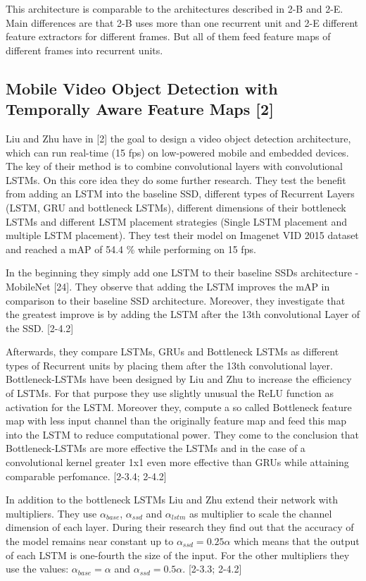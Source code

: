 \documentclass[conference]{IEEEtran}
\begin{document}
This architecture is comparable to the architectures described in 2-B and 2-E. Main differences are that 2-B uses more than one recurrent unit and 2-E different feature extractors for different frames. But all of them feed feature maps of different frames into recurrent units. 
 
\subsection{Mobile Video Object Detection with Temporally Aware Feature Maps [2]}
Liu and Zhu have in [2] the goal to design a video object detection architecture, which can run real-time (15 fps) on low-powered mobile and embedded devices. The key of their method is to combine convolutional layers with convolutional LSTMs. On this core idea they do some further research. They test the benefit from adding an LSTM into the baseline SSD, different types of Recurrent Layers (LSTM, GRU and bottleneck LSTMs), different dimensions of their bottleneck LSTMs and different LSTM placement strategies (Single LSTM placement and multiple LSTM placement). They test their model on Imagenet VID 2015 dataset and reached a mAP of 54.4 \% while performing on 15 fps.  \newline

In the beginning they simply add one LSTM to their baseline SSDs architecture - MobileNet [24]. They observe that adding the LSTM improves the mAP in comparison to their baseline SSD architecture. Moreover, they investigate that the greatest improve is by adding the LSTM after the 13th convolutional Layer of the SSD. [2-4.2] \newline

Afterwards, they compare LSTMs, GRUs and Bottleneck LSTMs as different types of Recurrent units by placing them after the 13th convolutional layer. Bottleneck-LSTMs have been designed by Liu and Zhu to increase the efficiency of LSTMs.  For that purpose they use slightly unusual the ReLU function as activation for the LSTM. Moreover they, compute a so called Bottleneck feature map with less input channel than the originally feature map and feed this map into the LSTM to reduce computational power. They come to the conclusion that Bottleneck-LSTMs are more effective the LSTMs and in the case of a convolutional kernel greater 1x1 even more effective than GRUs while attaining comparable perfomance. [2-3.4; 2-4.2]\newline

In addition to the bottleneck LSTMs Liu and Zhu extend their network with multipliers. They use $\alpha_{base}$, $\alpha_{ssd}$ and $\alpha_{lstm}$ as multiplier to scale the channel dimension of each layer. During their research they find out that the accuracy of the model remains near constant up to $\alpha_{ssd}= 0.25 \alpha$ which means that the output of each LSTM is one-fourth the size of the input. For the other multipliers they use the values: $\alpha_{base} = \alpha$ and $\alpha_{ssd} = 0.5 \alpha$. [2-3.3; 2-4.2] \newline
\end{document}
